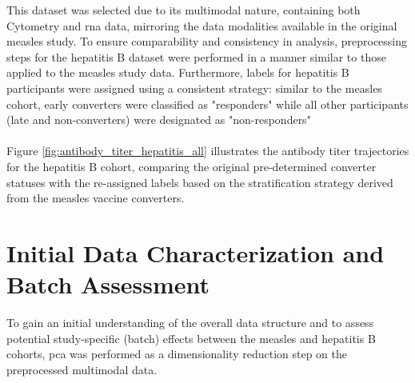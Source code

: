 \documentclass[12pt,a4paper]{report}
\begin{document}
\noindent
This dataset was selected due to its multimodal nature, containing both Cytometry and \acrshort{rna} data, mirroring the data modalities available in the original measles study. To ensure comparability and consistency in analysis, preprocessing steps for the hepatitis B dataset were performed in a manner similar to those applied to the measles study data. Furthermore, labels for hepatitis B participants were assigned using a consistent strategy: similar to the measles cohort, early converters were classified as "responders" while all other participants (late and non-converters) were designated as "non-responders"\\
\\
Figure \ref{fig:antibody_titer_hepatitis_all} illustrates the antibody titer trajectories for the hepatitis B cohort, comparing the original pre-determined converter statuses with the re-assigned labels based on the stratification strategy derived from the measles vaccine converters.

\section{Initial Data Characterization and Batch Assessment}
\noindent
To gain an initial understanding of the overall data structure and to assess potential study-specific (batch) effects between the measles and hepatitis B cohorts, \acrfull{pca} was performed as a dimensionality reduction step on the preprocessed multimodal data.\\
\end{document}
